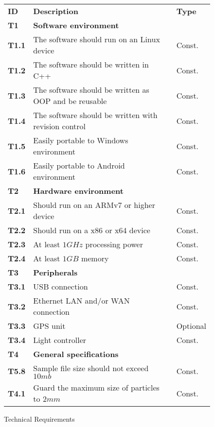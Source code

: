 \documentclass[11pt,fleqn,,a4paper,twoside,openright]{book}
\begin{document}
\begin{figure}[h]
	\begin{tabular}{|p{1cm}| p{10cm} p{1.5cm}|}
		\rowcolor{ocre}
		\hline \textbf{ID} & \textbf{Description} & \textbf{Type} \\ 
		\rowcolor{bananamania}
		\hline \textbf{T1}\label{T1} & \textbf{Software environment} &  \\ 
		\hline \textbf{T1.1}\label{T1.1} & The software should run on an Linux device & Const. \\ 
		\hline \textbf{T1.2}\label{T1.2} & The software should be written in C++ & Const. \\ 
		\hline \textbf{T1.3}\label{T1.3} & The software should be written as OOP and be reusable & Const. \\ 
		\hline \textbf{T1.4}\label{T1.4} & The software should be written with revision control & Const. \\
		\hline \textbf{T1.5}\label{T1.5} & Easily portable to Windows environment & Const. \\
		\hline \textbf{T1.6}\label{T1.6} & Easily portable to Android environment & Const. \\
		\rowcolor{bananamania}
		\hline \textbf{T2}\label{T2} & \textbf{Hardware environment} &  \\ 
		\hline \textbf{T2.1}\label{T2.1} & Should run on an ARMv7 or higher device &  Const. \\ 
		\hline \textbf{T2.2}\label{T2.2} & Should run on a x86 or x64 device & Const. \\
		\hline \textbf{T2.3}\label{T2.3} & At least $1 GHz$ processing power & Const. \\
		\hline \textbf{T2.4}\label{T2.4} & At least $1 GB$ memory & Const. \\
		\rowcolor{bananamania}
		\hline \textbf{T3}\label{T3} & \textbf{Peripherals}  &  \\ 
		\hline \textbf{T3.1}\label{T3.1} & USB connection  & Const. \\ 
		\hline \textbf{T3.2}\label{T3.2} & Ethernet LAN and/or WAN connection  & Const. \\ 
		\hline \textbf{T3.3}\label{T3.3} & GPS unit & Optional  \\ 
		\hline \textbf{T3.4}\label{T3.4} & Light controller & Const. \\
		\rowcolor{bananamania}
		\hline \textbf{T4}\label{T4} & \textbf{General specifications} &  \\ 
		\hline \textbf{T5.8}\label{T4.1} & Sample file size should not exceed $ 10 mb $ & Const. \\
		\hline \textbf{T4.1}\label{T4.2} & Guard the maximum size of particles to $ 2 mm $ & Const.	\end{tabular} 
	\caption{Technical Requirements}\label{Technical Requirements}
\end{figure}
\end{document}

